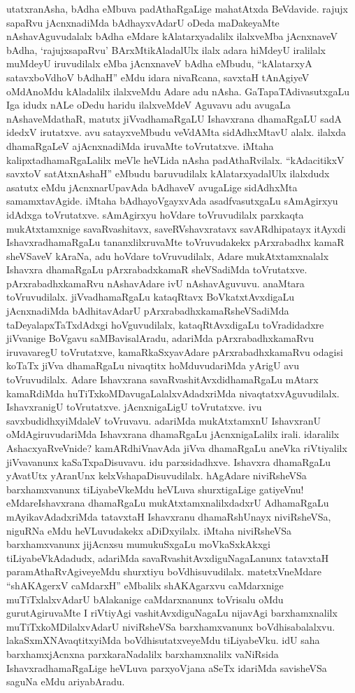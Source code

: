 \begin{artha}
utatxra\ndash  nAsha, bAdha eMbuva padAthaRgaLige mahatAtxda BeVdavide. rajujx sapaRvu jAcnxnadiMda bAdhayxvAdarU oDeda maDakeyaMte nAshavAguvudalalx bAdha eMdare kAlatarxyadalilx ilalxveMba jAcnxnaveV bAdha, `rajujxsapaRvu' BArxMtikAladalUlx ilalx adara hiMdeyU iralilalx muMdeyU iruvudilalx eMba jAcnxnaveV bAdha eMbudu, ``kAlatarxyA satavxboVdhoV bAdhaH'' eMdu idara nivaRcana, savxtaH tAnAgiyeV oMdAnoMdu kAladalilx ilalxveMdu Adare adu nAsha. GaTapaTAdivasutxgaLu Iga idudx nALe oDedu haridu ilalxveMdeV Aguvavu adu avugaLa nAshaveMdathaR, matutx jiVvadhamaRgaLU Ishavxrana dhamaRgaLU sadA idedxV irutatxve. avu satayxveMbudu veVdAMta sidAdhxMtavU alalx. ilalxda dhamaRgaLeV ajAcnxnadiMda iruvaMte toVrutatxve. iMtaha kalipxtadhamaRgaLalilx meVle heVLida nAsha padAthaRvilalx. ``kAdacitikxV savxtoV satAtxnAshaH'' eMbudu baruvudilalx kAlatarxyadalUlx ilalxdudx asatutx eMdu jAcnxnarUpavAda bAdhaveV avugaLige sidAdhxMta samamxtavAgide. iMtaha bAdhayoVgayxvAda asadfvasutxgaLu sAmAgirxyu idAdxga toVrutatxve. sAmAgirxyu hoVdare toVruvudilalx parxkaqta mukAtxtamxnige savaRvashitavx, saveRVshavxratavx savARdhipatayx itAyxdi IshavxradhamaRgaLu tananxlilxruvaMte toVruvudakekx pArxrabadhx kamaR sheVSaveV kAraNa, adu hoVdare toVruvudilalx, Adare mukAtxtamxnalalx Ishavxra dhamaRgaLu pArxrabadxkamaR sheVSadiMda toVrutatxve. pArxrabadhxkamaRvu nAshavAdare ivU nAshavAguvuvu. anaMtara toVruvudilalx. jiVvadhamaRgaLu kataqRtavx BoVkatxtAvxdigaLu jAcnxnadiMda bAdhitavAdarU pArxrabadhxkamaRsheVSadiMda taDeyalapxTaTxdAdxgi hoVguvudilalx, kataqRtAvxdigaLu toVradidadxre jiVvanige BoVgavu saMBavisalAradu, adariMda pArxrabadhxkamaRvu iruvavaregU toVrutatxve, kamaRkaSxyavAdare pArxrabadhxkamaRvu odagisi koTaTx jiVva dhamaRgaLu nivaqtitx hoMduvudariMda yArigU avu toVruvudilalx. Adare Ishavxrana savaRvashitAvxdidhamaRgaLu mAtarx kamaRdiMda huTiTxkoMDavugaLalalxvAdadxriMda nivaqtatxvAguvudilalx. IshavxranigU toVrutatxve. jAcnxnigaLigU toVrutatxve. ivu savxbudidhxyiMdaleV toVruvavu. adariMda mukAtxtamxnU IshavxranU oMdAgiruvudariMda Ishavxrana dhamaRgaLu jAcnxnigaLalilx irali. idaralilx AshacxyaRveVnide? kamARdhiVnavAda jiVva dhamaRgaLu aneVka riVtiyalilx jiVvavanunx kaSaTxpaDisuvavu. idu parxsidadhxve. Ishavxra dhamaRgaLu yAvatUtx yAranUnx kelxVshapaDisuvudilalx. hAgAdare niviRsheVSa barxhamxvanunx tiLiyabeVkeMdu heVLuva shurxtigaLige gatiyeVnu! eMdare\ndash  Ishavxrana dhamaRgaLu mukAtxtamxnalilxdadxrU AdhamaRgaLu mAyikavAdadxriMda tatavxtaH Ishavxranu dhamaRshUnayx niviRsheVSa, niguRNa eMdu heVLuvudakekx aDiDxyilalx. iMtaha niviRsheVSa barxhamxvanunx jijAcnxsu mumukuSxgaLu moVkaSxkAkxgi tiLiyabeVkAdadudx, adariMda savaRvashitAvxdiguNagaLanunx tatavxtaH paramAthaRvAgiveyeMdu shurxtiyu boVdhisuvudilalx. matetxVneMdare ``shAKAgerxV caMdarxH'' eMbalilx shAKAgarxvu caMdarxnige muTiTxlalxvAdarU bAlakanige caMdarxnanunx toVrisalu oMdu gurutAgiruvaMte I riVtiyAgi vashitAvxdiguNagaLu nijavAgi barxhamxnalilx muTiTxkoMDilalxvAdarU niviRsheVSa barxhamxvanunx boVdhisabalalxvu. lakaSxmXNAvaqtitxyiMda boVdhisutatxveyeMdu tiLiyabeVku. idU saha barxhamxjAcnxna parxkaraNadalilx barxhamxnalilx vaNiRsida IshavxradhamaRgaLige heVLuva parxyoVjana aSeTx idariMda savisheVSa saguNa eMdu ariyabAradu.


\end{artha}
